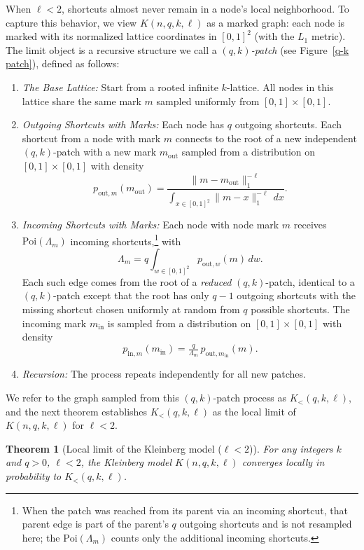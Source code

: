 \documentclass[10pt]{amsart}
\newtheorem{theorem}{Theorem}[section]
\begin{document}
When $\ell < 2$, shortcuts almost never remain in a node’s local neighborhood. To capture this behavior, we view $K(n,q,k,\ell)$ as a marked graph: each node is marked with its normalized lattice coordinates in $[0,1]^2$ (with the $L_1$ metric). 
The limit object is a recursive structure we call a \emph{$(q,k)$-patch} (see Figure~\ref{q-k patch}), defined as follows:
\begin{enumerate}
    \item \textit{The Base Lattice:} Start from a rooted infinite $k$-lattice.  All nodes in this lattice share the same mark \(m\) sampled uniformly from \([0,1] \times [0,1]\).    
    \item \textit{Outgoing Shortcuts with Marks:} Each node has $q$ outgoing shortcuts. Each shortcut from a node with mark \(m\) connects to the root of a new independent $(q,k)$-patch with a new mark $m_{\mathrm{out}}$ sampled from a distribution on \([0,1] \times [0,1]\) with density
    \[
      p_{\mathrm{out},m}(m_{\mathrm{out}}) = \frac{\|m-m_{\mathrm{out}}\|_1^{-\ell}}{\int_{x \in [0,1]^2} \|m-x\|_1^{-\ell}\, dx}.
    \]
    \item \textit{Incoming Shortcuts with Marks:}  Each node with node mark \(m\) receives $\text{Poi}(\Lambda_m)$ incoming shortcuts,\footnote{When the patch was reached from its parent via an incoming shortcut, that parent edge is part of the parent's $q$ outgoing shortcuts and is not resampled here; the $\mathrm{Poi}(\Lambda_m)$ counts only the additional incoming shortcuts.} with
    \[
      \Lambda_m = q \int_{w \in [0,1]^2} p_{\mathrm{out},w}(m)\, dw.
    \]
    Each such edge comes from the root of a \emph{reduced} $(q,k)$-patch, identical to a $(q,k)$-patch except that the root has only $q-1$ outgoing shortcuts with the missing shortcut chosen uniformly at random from \(q\) possible shortcuts. 
    The incoming mark $m_{\text{in}}$ is sampled from a distribution on \([0,1] \times [0,1]\) with density
    \[
      p_{\text{in},m}(m_{\text{in}}) = \tfrac{q}{\Lambda_m}\,p_{\mathrm{out},m_{\text{in}}}(m).
    \]
    \item \textit{Recursion:} The process repeats independently for all new patches.
\end{enumerate}
We refer to the graph sampled from this $(q,k)$-patch process as $K_{<}(q,k,\ell)$, and the next theorem establishes $K_{<}(q,k,\ell)$ as the local limit of $K(n,q,k,\ell)$ for $\ell < 2$.

\begin{theorem}[Local limit of the Kleinberg model ($\ell < 2$)] \label{main-thm-kl-1} For any integers $k$ and $q>0$, $\ell < 2$, the Kleinberg model $K(n,q,k,\ell)$ converges locally in  probability to  $K_{<}(q,k,\ell)$.
\end{theorem}
\end{document}
